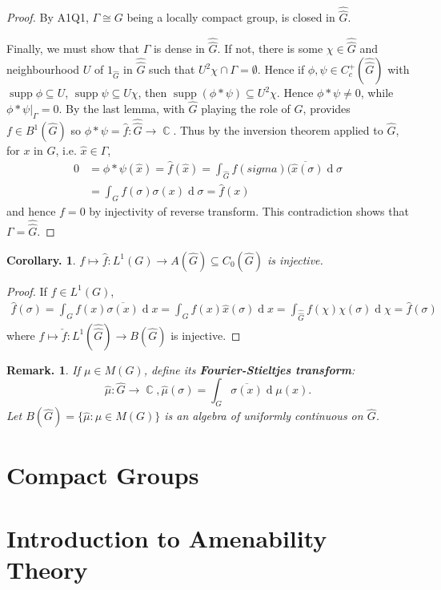 \documentclass[11pt, a4paper]{memoir}
\DeclareMathOperator{\C}{{\mathbb{C}}}
\theoremstyle{change}
\newtheorem{corollary}[theorem]{Corollary.}
\theoremstyle{plain}
\theoremstyle{nonumberplain}
\newtheorem{remark}{Remark.}
\newtheorem{proof}{Proof}
\DeclareMathOperator{\supp}{supp}
\renewcommand{\d}[1]{\ensuremath{\operatorname{d}\!{#1}}}
\newcommand{\defn}[1]{{\boldmath\bfseries #1}}
\numberwithin{equation}{section}
\begin{document}
\begin{proof}
    By A1Q1, $\Gamma\cong G$ being a locally compact group, is closed in $\widehat{\widehat{G}}$.

    Finally, we must show that $\Gamma$ is dense in $\widehat{\widehat{G}}$.
    If not, there is some $\chi\in\widehat{\widehat{G}}$ and neighbourhood $U$ of $1_{\widehat{G}}$ in $\widehat{\widehat{G}}$ such that $U^2\chi\cap\Gamma=\emptyset$.
    Hence if $\phi,\psi\in C_c^+(\widehat{\widehat{G}})$ with $\supp\phi\subseteq U$, $\supp\psi\subseteq U\chi$, then $\supp(\phi*\psi)\subseteq U^2\chi$.
    Hence $\phi*\psi\neq 0$, while $\phi*\psi|_\Gamma=0$.
    By the last lemma, with $\widehat{G}$ playing the role of $G$, provides $f\in B^1(\widehat{G})$ so $\phi*\psi=\hat{f}:\widehat{\widehat{G}}\to\C$.
    Thus by the inversion theorem applied to $\widehat{G}$, for $x$ in $G$, i.e. $\hat{x}\in\Gamma$,
    \begin{align*}
        0&= \phi*\psi(\hat{x}) = \hat{f}(\hat{x})=\int_{\widehat{G}}f(sigma)\overline{(\hat{x}(\sigma)}\d{\sigma}\\
         &=\int_G f(\sigma)\sigma(x)\d{\sigma}=\hat{f}(x)
    \end{align*}
    and hence $f=0$ by injectivity of reverse transform.
    This contradiction shows that $\Gamma=\widehat{\widehat{G}}$.
\end{proof}
\begin{corollary}
    $f\mapsto\hat{f}:L^1(G)\to A(\widehat{G})\subseteq C_0(\widehat{G})$ is injective.
\end{corollary}
\begin{proof}
    If $f\in L^1(G)$,
    \begin{align*}
        \hat{f}(\sigma)=\int_Gf(x)\overline{\sigma(x)}\d{x}=\int_Gf(x)\hat{x}(\sigma)\d{x}=\int_{\widehat{\widehat{G}}}f(\chi)\chi(\sigma)\d{\chi}=\hat{f}(\sigma)
    \end{align*}
    where $f\mapsto\check{f}:L^1(\widehat{\widehat{G}})\to B(\widehat{G})$ is injective.
\end{proof}
\begin{remark}
    If $\mu\in M(G)$, define its \defn{Fourier-Stieltjes transform}:
    \begin{equation*}
        \hat{\mu}:\widehat{G}\to\C,\hat{\mu}(\sigma)=\int_G\overline{\sigma(x)}\d{\mu(x)}.
    \end{equation*}
    Let $B(\hat{G})=\{\hat{\mu}:\mu\in M(G)\}$ is an algebra of uniformly continuous on $\hat{G}$.
\end{remark}
\section{Compact Groups}
\section{Introduction to Amenability Theory}
\end{document}
